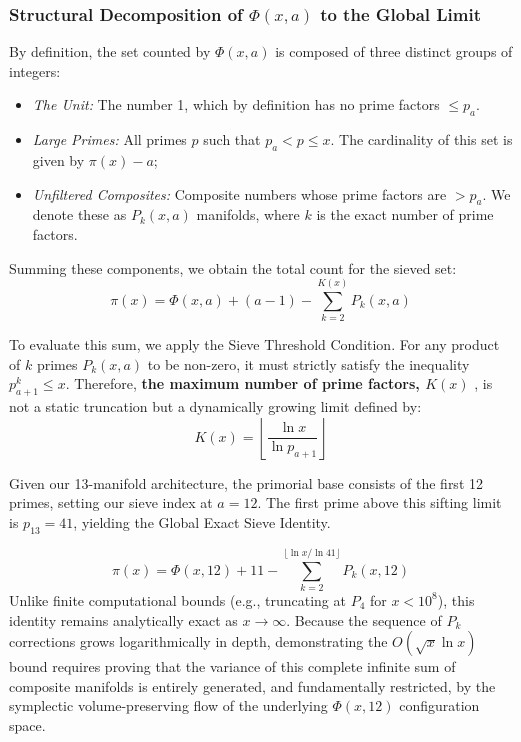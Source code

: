 \documentclass[sn-mathphys-num, pdflatex, referee]{sn-jnl}
\begin{document}
\subsubsection{Structural Decomposition of \texorpdfstring{$\Phi(x,a)$}{Phi(x,a)} to the Global Limit}
By definition, the set counted by $\Phi(x,a)$ is composed of three distinct groups of integers:
\begin{itemize}
    \item \textit{The Unit:} The number 1, which by definition has no prime  factors $\le p_a$.
    \item \textit{Large Primes:} All primes $p$ such that $p_a < p \le x$. The cardinality of this set is given by $\pi(x) - a$;
    \item \textit{Unfiltered Composites:} Composite numbers whose prime factors are $> p_a$. We denote these as $P_k(x,a)$ manifolds, where $k$ is the exact number of prime factors.
\end{itemize}

Summing these components, we obtain the total count for the sieved set:
\begin{equation}
\pi(x) = \Phi(x,a) + (a - 1) - \sum_{k=2}^{K(x)} P_k(x,a)
\end{equation}

To evaluate this sum, we apply the Sieve Threshold Condition. For any product of $k$ primes $P_k(x,a)$ to be non-zero, it must strictly satisfy the inequality $p_{a+1}^k \le x$. Therefore, \textbf{the maximum number of prime factors, $K(x)$} \label{Kx}, is not a static truncation but a dynamically growing limit defined by:
\begin{equation}
K(x) = \left\lfloor \frac{\ln x}{\ln p_{a+1}} \right\rfloor
\end{equation}

Given our 13-manifold architecture, the primorial base consists of the first 12 primes, setting our sieve index at $a=12$. The first prime above this sifting limit is $p_{13} = 41$, yielding the Global Exact Sieve Identity.

\begin{equation}
\label{eq:global_sieve}
\pi(x) = \Phi(x,12) + 11 - \sum_{k=2}^{\lfloor \ln x / \ln 41 \rfloor} P_k(x,12)
\end{equation}
Unlike finite computational bounds (e.g., truncating at $P_4$ for $x < 10^8$), this identity remains analytically exact as $x \rightarrow \infty$. Because the sequence of $P_k$ corrections grows logarithmically in depth, demonstrating the $O(\sqrt{x} \ln x)$ bound requires proving that the variance of this complete infinite sum of composite manifolds is entirely generated, and fundamentally restricted, by the symplectic volume-preserving flow of the underlying $\Phi(x,12)$ configuration space.
\end{document}
